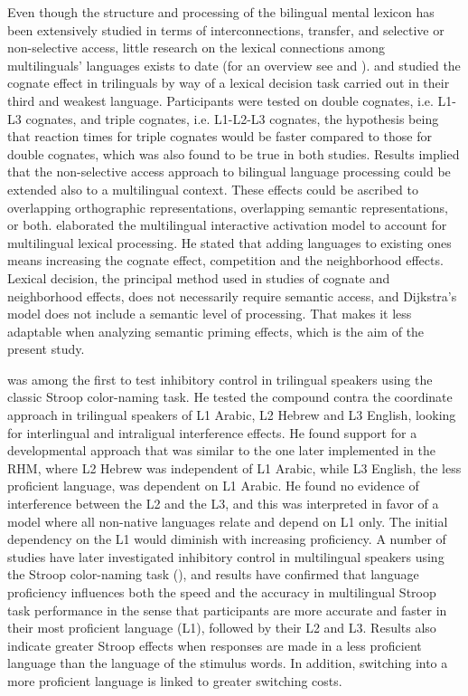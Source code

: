 \documentclass[output=paper,colorlinks,citecolor=brown,nonflat]{langsci/langscibook}
\begin{document}
Even though the structure and processing of the bilingual mental lexicon has been extensively studied in terms of interconnections, transfer, and selective or non-selective access, little research on the lexical connections among multilinguals’ languages exists to date (for an overview see \citealt{CenozEtAl2003} and \citealt{Szubko-Sitarek2015}). \citet{Szubko-Sitarek2011} and \citet{LemhöferEtAl2004} studied the cognate effect in trilinguals by way of a lexical decision task carried out in their third and weakest language. Participants were tested on double cognates, i.e. L1-L3 cognates, and triple cognates, i.e. L1-L2-L3 cognates, the hypothesis being that reaction times for triple cognates would be faster compared to those for double cognates, which was also found to be true in both studies. Results implied that the non-selective access approach to bilingual language processing could be extended also to a multilingual context. These effects could be ascribed to overlapping orthographic representations, overlapping semantic representations, or both. \citet{Dijkstra2003} elaborated the multilingual interactive activation model to account for multilingual lexical processing. He stated that adding languages to existing ones means increasing the cognate effect, competition and the neighborhood effects. Lexical decision, the principal method used in studies of cognate and neighborhood effects, does not necessarily require semantic access, and Dijkstra’s model does not include a semantic level of processing. That makes it less adaptable when analyzing semantic priming effects, which is the aim of the present study.

\citet{Abunuwara1992} was among the first to test inhibitory control in trilingual speakers using the classic Stroop color-naming task. He tested the compound contra the coordinate approach in trilingual speakers of L1 Arabic, L2 Hebrew and L3 English, looking for interlingual and intraligual interference effects. He found support for a developmental approach that was similar to the one later implemented in the RHM, where L2 Hebrew was independent of L1 Arabic, while L3 English, the less proficient language, was dependent on L1 Arabic. He found no evidence of interference between the L2 and the L3, and this was interpreted in favor of a model where all non-native languages relate and depend on L1 only. The initial dependency on the L1 would diminish with increasing proficiency. A number of studies have later investigated inhibitory control in multilingual speakers using the Stroop color-naming task (\citealt{SchwieterSunderman2011, LinckEtAl2012, MarianEtAl2013}), and results have confirmed that language proficiency influences both the speed and the accuracy in multilingual Stroop task performance in the sense that participants are more accurate and faster in their most proficient language (L1), followed by their L2 and L3. Results also indicate greater Stroop effects when responses are made in a less proficient language than the language of the stimulus words. In addition, switching into a more proficient language is linked to greater switching costs.
\end{document}
